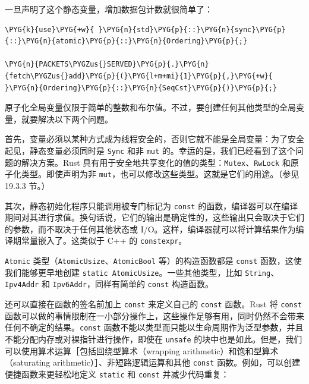 一旦声明了这个静态变量，增加数据包计数就很简单了：

\begin{Verbatim}[commandchars=\\\{\},breaklines=true,breakanywhere=true,fontsize=\codefont,xleftmargin=17bp]
\PYG{k}{use}\PYG{+w}{ }\PYG{n}{std}\PYG{p}{::}\PYG{n}{sync}\PYG{p}{::}\PYG{n}{atomic}\PYG{p}{::}\PYG{n}{Ordering}\PYG{p}{;}

\PYG{n}{PACKETS\PYGZus{}SERVED}\PYG{p}{.}\PYG{n}{fetch\PYGZus{}add}\PYG{p}{(}\PYG{l+m+mi}{1}\PYG{p}{,}\PYG{+w}{ }\PYG{n}{Ordering}\PYG{p}{::}\PYG{n}{SeqCst}\PYG{p}{)}\PYG{p}{;}
\end{Verbatim}

原子化全局变量仅限于简单的整数和布尔值。不过，要创建任何其他类型的全局变量，就要解决以下两个问题。

首先，变量必须以某种方式成为线程安全的，否则它就不能是全局变量：为了安全起见，静态变量必须同时是 \texttt{Sync} 和非 \texttt{mut} 的。幸运的是，我们已经看到了这个问题的解决方案。Rust 具有用于安全地共享变化的值的类型：\texttt{Mutex}、\texttt{RwLock} 和原子化类型。即使声明为非 \texttt{mut}，也可以修改这些类型。这就是它们的用途。（参见 19.3.3 节。）

其次，静态初始化程序只能调用被专门标记为 \texttt{const} 的函数，编译器可以在编译期间对其进行求值。换句话说，它们的输出是确定性的，这些输出只会取决于它们的参数，而不取决于任何其他状态或 I/O。这样，编译器就可以将计算结果作为编译期常量嵌入了。这类似于 C++ 的 \texttt{constexpr}。

\texttt{Atomic} 类型（\texttt{AtomicUsize}、\texttt{AtomicBool} 等）的构造函数都是 \texttt{const} 函数，这使我们能够更早地创建 \texttt{static AtomicUsize}。一些其他类型，比如 \texttt{String}、\texttt{Ipv4Addr} 和 \texttt{Ipv6Addr}，同样有简单的 \texttt{const} 构造函数。

还可以直接在函数的签名前加上 \texttt{const} 来定义自己的 \texttt{const} 函数。Rust 将 \texttt{const} 函数可以做的事情限制在一小部分操作上，这些操作足够有用，同时仍然不会带来任何不确定的结果。\texttt{const} 函数不能以类型而只能以生命周期作为泛型参数，并且不能分配内存或对裸指针进行操作，即使在 \texttt{unsafe} 的块中也是如此。但是，我们可以使用算术运算［包括回绕型算术（wrapping arithmetic）和饱和型算术（saturating arithmetic）］、非短路逻辑运算和其他 \texttt{const} 函数。例如，可以创建便捷函数来更轻松地定义 \texttt{static} 和 \texttt{const} 并减少代码重复：

